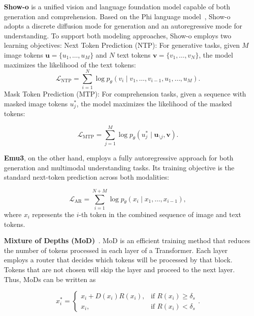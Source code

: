 \textbf{Show-o} is a unified vision and language foundation model capable of both generation and comprehension. Based on the Phi language model~\cite{phi1.5}, Show-o adopts a discrete diffusion mode for generation and an autoregressive mode for understanding. To support both modeling approaches, Show-o employs two learning objectives:
Next Token Prediction (NTP): For generative tasks, given $M$ image tokens $\mathbf{u} = \{u_1, \ldots, u_M\}$ and $N$ text tokens $\mathbf{v} = \{v_1, \ldots, v_N\}$, the model maximizes the likelihood of the text tokens:
\begin{equation}
\mathcal{L}_{\text{NTP}} = \sum_{i=1}^{N} \log p_\theta(v_i \mid v_{1}, \ldots, v_{i-1}, u_{1}, \ldots, u_{M}).
\end{equation}
Mask Token Prediction (MTP): For comprehension tasks, given a sequence with masked image tokens $u_j^*$, the model maximizes the likelihood of the masked tokens:


\begin{equation}
\mathcal{L}_{\text{MTP}} = \sum_{j=1}^{M} \log p_\theta(u_j^* \mid \mathbf{u}_{\setminus j}, \mathbf{v}).
\end{equation}

\textbf{Emu3}, on the other hand, employs a fully autoregressive approach for both generation and multimodal understanding tasks. Its training objective is the standard next-token prediction across both modalities:

\begin{equation}
\mathcal{L}_{\text{AR}} = \sum_{i=1}^{N+M} \log p_\theta(x_i \mid x_{1}, \ldots, x_{i-1}),
\end{equation}
where $x_i$ represents the $i$-th token in the combined sequence of image and text tokens.




\textbf{Mixture of Depths (MoD)}~\cite{mod}. MoD is an efficient training method that reduces the number of tokens processed in each layer of a Transformer. Each layer employs a router that decides which tokens will be processed by that block. Tokens that are not chosen will skip the layer and proceed to the next layer. Thus, MoDs can be written as 


\begin{equation}
x_i^{*} =
\begin{cases}
x_i + D(x_i) R(x_i), & \text{if } R(x_i) \geq \delta_s \\
x_i, & \text{if } R(x_i) < \delta_s
\end{cases}
.
\end{equation}

